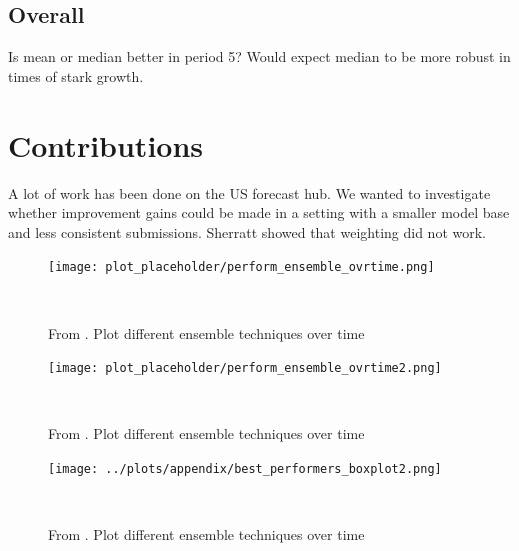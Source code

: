 \subsection{Overall}
Is mean or median better in period 5? Would expect median to be more robust in times of stark growth.
\section{Contributions}
A lot of work has been done on the US forecast hub. We wanted to investigate whether improvement gains could be made in a setting with a smaller model base and less consistent submissions. Sherratt showed that weighting did not work.
\begin{figure}
\centering
\texttt{[image: plot\_placeholder/perform\_ensemble\_ovrtime.png]}
\caption{From \cite{ray_ensemble_2020}. Plot different ensemble techniques over time}
\
\end{figure}
\begin{figure}
\centering
\texttt{[image: plot\_placeholder/perform\_ensemble\_ovrtime2.png]}
\caption{From \cite{ray_ensemble_2020}. Plot different ensemble techniques over time}
\
\end{figure}



\appendix
\begin{figure}
\centering
\texttt{[image: ../plots/appendix/best\_performers\_boxplot2.png]}
\caption{From \cite{ray_ensemble_2020}. Plot different ensemble techniques over time}
\
\end{figure}


